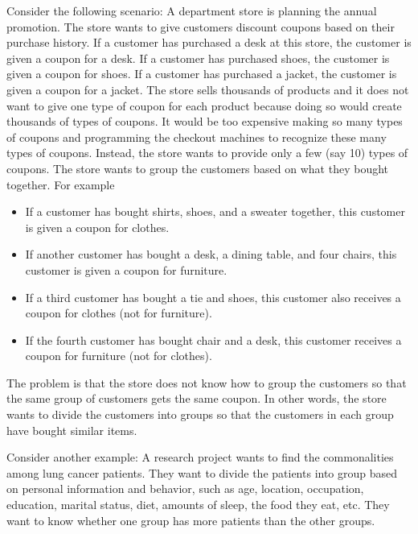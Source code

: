 Consider the following scenario: A department store is planning the
annual promotion. The store wants to give customers discount coupons
based on their purchase history.  If a customer has purchased a desk
at this store, the customer is given a coupon for a desk.
If a customer has purchased shoes,
the customer is given a coupon for shoes.  If a customer has purchased
a jacket, the customer is given a coupon for a jacket.  The store
sells thousands of products and it does not want to give one type of
coupon for each product because doing so would create thousands of
types of coupons.  It would be too expensive making so many types of
coupons and programming the checkout machines to recognize these many
types of coupons.  Instead, the store wants to provide only a few (say
10) types of coupons.  The store wants to group the customers based on
what they bought together.  For example
\begin{itemize}

\item If a customer has bought shirts, shoes, and a sweater together,
  this customer is given a coupon for clothes.

\item If another customer has bought a desk, a dining table, and four
  chairs, this customer is given a coupon for furniture.

\item If a third customer has bought a tie and shoes, this customer
  also receives a coupon for clothes (not for furniture).

\item If the fourth customer has bought chair and a desk, this
  customer receives a coupon for furniture (not for clothes).

\end{itemize}
The problem is that the store does
not know how to group the customers so that the same group of
customers gets the same coupon.  In other words, the store wants to
divide the customers into groups so that the customers in each group
have bought similar items.

Consider another example: A research project wants to find the
commonalities among lung cancer patients. They want to divide the
patients into group based on personal information and behavior, such
as age, location, occupation, education, marital status, diet, amounts
of sleep, the food they eat, etc. They want to know whether one group
has more patients than the other groups.


